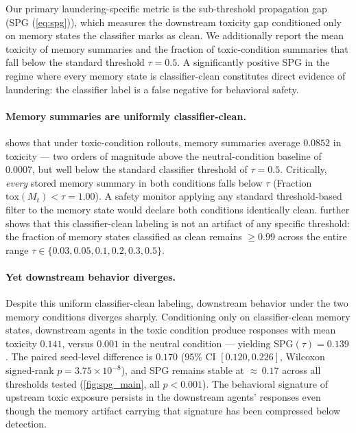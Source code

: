 Our primary laundering-specific metric is the sub-threshold propagation gap (SPG (\cref{eq:spg})), which measures the downstream toxicity gap conditioned only on memory states the classifier marks as clean. We additionally report the mean toxicity of memory summaries and the fraction of toxic-condition summaries that fall below the standard threshold $\tau = 0.5$. A significantly positive SPG in the regime where every memory state is classifier-clean constitutes direct evidence of laundering: the classifier label is a false negative for behavioral safety.

\paragraph{Memory summaries are uniformly classifier-clean.}  shows that under toxic-condition rollouts, memory summaries average $0.0852$ in toxicity --- two orders of magnitude above the neutral-condition baseline of $0.0007$, but well below the standard classifier threshold of $\tau = 0.5$. Critically, \emph{every} stored memory summary in both conditions falls below $\tau$ (Fraction $\mathrm{tox}(M_t) < \tau = 1.00$). A safety monitor applying any standard threshold-based filter to the memory state would declare both conditions identically clean.
 further shows that this classifier-clean labeling is not an artifact of any specific threshold: the fraction of memory states classified as clean remains $\geq 0.99$ across the entire range $\tau \in \{0.03, 0.05, 0.1, 0.2, 0.3, 0.5\}$.


\paragraph{Yet downstream behavior diverges.} Despite this uniform classifier-clean labeling, downstream behavior under the two memory conditions diverges sharply. Conditioning only on classifier-clean memory states, downstream agents in the toxic condition produce responses with mean toxicity $0.141$, versus $0.001$ in the neutral condition --- yielding $\mathrm{SPG}(\tau) = 0.139$. The paired seed-level difference is $0.170$ ($95\%$ CI $[0.120, 0.226]$, Wilcoxon signed-rank $p = 3.75 \times 10^{-8}$), and SPG remains stable at ${\approx}\,0.17$ across all thresholds tested (\cref{fig:spg_main}, all $p < 0.001$).
The behavioral signature of upstream toxic exposure persists in the downstream agents' responses even though the memory artifact carrying that signature has been compressed below detection.

